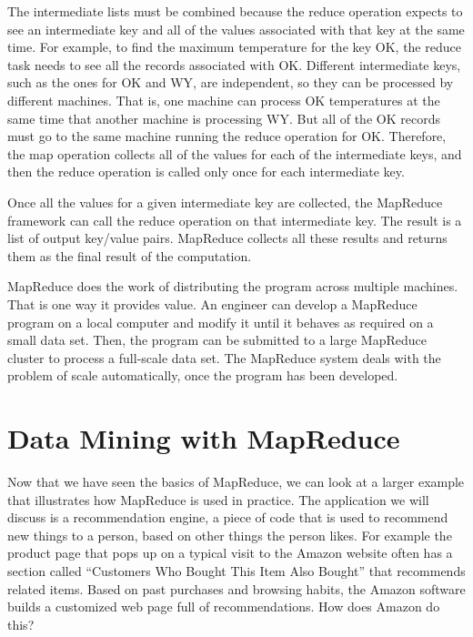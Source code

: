 The intermediate lists must be combined because
the reduce operation expects to see an intermediate key and all
of the values associated with that key at the same time. For example,
to find the maximum temperature for the key \textsf{OK}, the reduce
task needs to see all the records associated with \textsf{OK}.
Different intermediate keys, such as the ones for \textsf{OK} and \textsf{WY},
are independent, so they can be processed by different machines.
That is, one machine can process \textsf{OK} temperatures at the same
time that another machine is processing \textsf{WY}.
But all of the \textsf{OK} records must go to the same machine running
the reduce operation for \textsf{OK}.
Therefore, the map operation collects all of the values for
each of the intermediate keys, and then the reduce operation is
called only once for each intermediate key.

Once all the values for a given intermediate key are
collected, the MapReduce framework can call the reduce
operation on that intermediate key.  The result is a list of
output key/value pairs. MapReduce collects all these
results and returns them as the final result of the computation.

MapReduce does the work of distributing 
the program across multiple machines.
That is one way it provides value.
An engineer can develop a MapReduce program on
a local computer and modify it until it behaves as
required on a small data set.
Then, the program can be submitted to a large MapReduce cluster
to process a full-scale data set.
The MapReduce system deals with the problem of scale
automatically, once the program has been developed.

\section{Data Mining with MapReduce}

Now 
that we have seen the basics of MapReduce, we can look at
a larger example that illustrates how MapReduce is
used in practice.  The application we will discuss is a recommendation engine,
a piece of code that is used to recommend new things to a person,
based on other things the person likes.
For example the product page that pops up on a typical visit to
the Amazon website often has a section called ``Customers Who Bought
This Item Also Bought'' that recommends related items.
Based on past purchases and browsing habits, the Amazon software
builds a customized web page full of recommendations.
How does Amazon do this?

